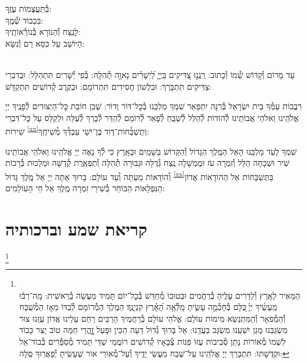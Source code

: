 \documentclass[twoside, openany, parskip=half, 11pt]{book}
\begin{document}

בְּ֯תַעֲצֻמוֹת עֻזֶּֽךָ:\\
בִּכְבוֹד שְׁ֯מֶֽךָ:\\
לָנֶֽצַח וְ֯הַנּוֹרָא בְּ֯נוֹרְ֯אוֹתֶֽיךָ:\\
הַיּוֹשֵׁב עַל כִּסֵּא רָם וְ֯נִשָּׂא:

\\
עַד מָרוֹם וְ֯קָדוֹשׁ שְׁ֯מוֹ וְ֯כָתוּב: רַֽנֲנ֣וּ צַ֭דִּיקִים בַּֽיְיָ֑ לַ֝יְשָׁרִ֗ים נָאוָ֥ה תְ֯הִלָּֽה: בְּ֯פִי יְ֯שָׁרִים תִּתְהַלָּל: וּבְדִבְרֵי צַדִּיקִים תִּתְבָּרַךְ: וּבִלְשׁוֹן חֲסִידִים תִּתְרוֹמָם: וּבְקֶֽרֶב קְ֯דוֹשִׁים תִּתְקַדָּשׁ:

רִבֲבוֹת עַמְּ֯ךָ בֵּית יִשְׂרָאֵל בְּ֯רִנָּה יִתְפָּאַר שִׁמְךָ מַלְכֵּֽנוּ בְּ֯כׇל־דּוֹר וָדוֹר: שֶׁכֵּן חוֹבַת כׇּל־הַיְצוּרִים לְ֯פָנֶֽיךָ יְיָ אֱלֹהֵֽינוּ וֵאלֹהֵי אֲבוֹתֵֽינוּ לְ֯הוֹדוֹת לְ֯הַלֵּל לְ֯שַׁבֵּֽחַ לְ֯פָאֵר לְ֯רוֹמֵם לְ֯הַדֵּר לְ֯בָרֵךְ לְ֯עַלֵּה וּלְקַלֵּס עַל כׇּל־דִּבְרֵי שִׁירוֹת \textsuperscript{\ref{xx}}וְתֻשְׁבְּ֯חוֹת־דָּוִד בֶּן־יִשַׁי עַבְדְּ֯ךָ מְ֯שִׁיחֶֽךָ:


שִׁמְךָ לָעַד מַלְכֵּֽנוּ הָאֵל הַמֶּֽלֶךְ הַגָּדוֹל וְ֯הַקָּדוֹשׁ בַּשָׁמַֽיִם וּבָאָֽרֶץ כִּי לְ֯ךָ נָאֶה יְיָ אֱלֹהֵֽינוּ וֵאלֹהֵי אֲבוֹתֵֽינוּ שִׁיר וּשְׁבָחָה הַלֵּל וְ֯זִמְרָה עֹז וּמֶמְשָׁלָה נֶֽצַח גְּ֯דֻלָּה וּגְבוּרָה תְּ֯הִלָּה וְ֯תִפְאֶֽרֶת קְ֯דֻשָּׁה וּמַלְכוּת בְּ֯רָכוֹת וְ֯הוֹדָאוֹת מֵעַתָּה וְ֯עַד עוֹלָם:
בָּרוּךְ אַתָּה יְיָ אֵל מֶֽלֶךְ גָּדוֹל \textsuperscript{\ref{xx}}בַּתֻּשְׁבָּחוֹת אֵל הַהוֹדָאוֹת אֲדוֹן הַנִּפְלָאוֹת הַבּוֹחֵר בְּ֯שִׁירֵי זִמְרָה מֶֽלֶךְ אֵל חֵי הָעוֹלָמִים:
\mimaamakim
\halfkaddish

\section*{ קריאת שמע וברכותיה }

\barachu


\footnote{\\
הַמֵּאִיר לָאָֽרֶץ וְ֯לַדָּרִים עָלֶֽיהָ בְּ֯רַחֲמִים וּבְטוּבוֹ מְ֯חַדֵּשׁ בְּ֯כׇל־יוֹם תָּמִיד מַעֲשֵׂה בְ֯רֵאשִׁית:
מָֽה־רַבּ֬וּ מַֽעֲשֶׂ֨יךָ יְיָ֗ ֖כֻּלָּם בְּ֯חָכְ֯מָ֣ה עָשִׂ֑יתָ מָֽלְ֯אָ֥ה הָ֝אָ֗רֶץ קִנְיָנֶֽךָ׃ הַמֶּֽלֶךְ הַמְ֯רוֹמָם לְ֯בַדּוֹ מֵאָז הַמְ֯שֻׁבָּח וְ֯הַמְ֯פֹאָר וְ֯הַמִּתְנַשֵּׂא מִימוֹת עוֹלָם: אֱלֹהֵי עוֹלָם בְּ֯רַחֲמֶיךָ הָרַבִּים רַחֵם עָלֵינוּ אֲדוֹן עֻזֵּֽנוּ צוּר מִשְׂגַּבֵּנוּ מָגֵן יִשְׁעֵֽנוּ מִשְׂגָּב בַּעֲדֵֽנוּ: אֵל בָּרוּךְ גְּ֯דוֹל דֵּעָה הֵכִין וּפָעַל זׇׇׇׇהֳרֵי חַמָּה טוֹב יָצַר כָּבוֹד לִשְׁמוֹ מְ֯אוֹרוֹת נָתַן סְ֯בִיבוֹת עֻזּוֹ פִּנּוֹת צְ֯בָאָיו קְ֯דוֹשִׁים רוֹמֲמֵי שַׁדַּי תָּמִיד מְ֯סַפְּ֯רִים כְּ֯בוֹד־אֵל וּקְדֻשָׁתוֹ: תִּתְבָּרַךְ יְיָ אֱלֹהֵֽינוּ עַל־שֶׁבַח מַעֲשֵׂי יָדֶֽיךָ וְ֯עַל־מְ֯אֽוֹרֵי אוֹר שֶׁעָשִֽׂיתָ יְ֯פָאֲרֽוּךָ סֶּֽלָה:
}
\end{document}
